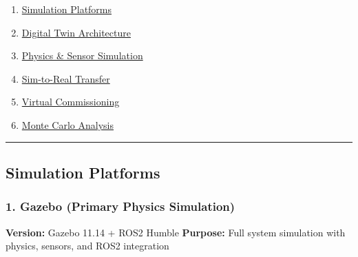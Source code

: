 \documentclass[
]{article}
\providecommand{\tightlist}{%
  \setlength{\itemsep}{0pt}\setlength{\parskip}{0pt}}
\begin{document}
\begin{enumerate}
\def\labelenumi{\arabic{enumi}.}
\tightlist
\item
  \protect\hyperlink{simulation-platforms}{Simulation Platforms}
\item
  \protect\hyperlink{digital-twin-architecture}{Digital Twin
  Architecture}
\item
  \protect\hyperlink{physics--sensor-simulation}{Physics \& Sensor
  Simulation}
\item
  \protect\hyperlink{sim-to-real-transfer}{Sim-to-Real Transfer}
\item
  \protect\hyperlink{virtual-commissioning}{Virtual Commissioning}
\item
  \protect\hyperlink{monte-carlo-analysis}{Monte Carlo Analysis}
\end{enumerate}

\begin{center}\rule{0.5\linewidth}{0.5pt}\end{center}

\hypertarget{simulation-platforms}{%
\subsection{Simulation Platforms}\label{simulation-platforms}}

\hypertarget{gazebo-primary-physics-simulation}{%
\subsubsection{1. Gazebo (Primary Physics
Simulation)}\label{gazebo-primary-physics-simulation}}

\textbf{Version:} Gazebo 11.14 + ROS2 Humble \textbf{Purpose:} Full
system simulation with physics, sensors, and ROS2 integration
\end{document}
